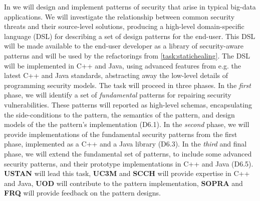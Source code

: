\begin{Workpackage}{\thewpno}
\begin{Task}


%
%
\end{Task}

\begin{Task}
	\TaskResults{%
	}
	\TaskHeader{}
	
In \theTask{} we will design and implement patterns of security that arise in typical big-data applications. We will investigate the relationship between common security threats and their source-level solutions, producing a high-level domain-specific language (DSL) for describing a set of design patterns for the end-user. This DSL will be made available to the end-user developer as a library of security-aware patterns and will be used by the refactorings from \ref{task:statichealing}. The DSL will be implemented in C++ and Java, using advanced features from e.g. the latest C++ and Java standards, abstracting away the low-level details of programming security models.
%
The task will proceed in three phases. In the \emph{first} phase, we will identify a set of \emph{fundamental} patterns for repairing security vulnerabilities. These patterns will reported as high-level schemas, encapsulating the side-conditions to the pattern, the semantics of the pattern, and design models of the the pattern's implementation (D6.1).
In the \emph{second} phase, we will provide implementations of the fundamental security patterns from the first phase, implemented as a C++ and a Java library (D6.3). In the \emph{third} and final phase, we will extend the fundamental set of patterns, to include some advanced security patterns, and their prototype implementations in C++ and Java (D6.5).  \textbf{USTAN} will lead this task, \textbf{UC3M} and \textbf{SCCH} will provide expertise in C++ and Java, \textbf{UOD} will contribute to the pattern implementation, \textbf{SOPRA} and \textbf{FRQ} will provide feedback on the pattern designs. 
\end{Task}


\end{Workpackage}
